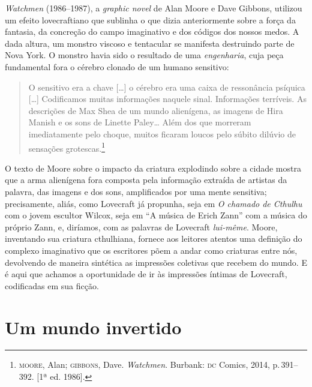 \emph{Watchmen} (1986--1987), a \emph{graphic novel} de Alan Moore e Dave
Gibbons, utilizou um efeito lovecraftiano que sublinha o que dizia
anteriormente sobre a força da fantasia, da concreção do campo
imaginativo e dos códigos dos nossos medos. A dada altura, um monstro
viscoso e tentacular se manifesta destruindo parte de Nova York. O
monstro havia sido o resultado de uma \emph{engenharia}, cuja peça
fundamental fora o cérebro clonado de um humano sensitivo: 

\begin{quote}
O sensitivo
era a chave [\ldots{}] o cérebro era uma caixa de ressonância psíquica [\ldots{}]
Codificamos muitas informações naquele sinal. Informações terríveis. As
descrições de Max Shea de um mundo alienígena, as imagens de Hira Manish
e os sons de Linette Paley\ldots{} Além dos que morreram imediatamente pelo
choque, muitos ficaram loucos pelo súbito dilúvio de sensações
grotescas.\footnote{\textsc{moore}, Alan; \textsc{gibbons}, Dave. \emph{Watchmen}.
  Burbank: \textsc{dc} Comics, 2014, p.\,391--392. [1ª ed. 1986].}
\end{quote}

O texto de Moore sobre o impacto da criatura explodindo sobre a cidade
mostra que a arma alienígena fora composta pela informação extraída de
artistas da palavra, das imagens e dos sons,
amplificados por uma mente sensitiva; precisamente, aliás, como
Lovecraft já propunha, seja em \emph{O chamado de Cthulhu} com o jovem
escultor Wilcox, seja em ``A música de Erich Zann'' com a música do
próprio Zann, e, diríamos, com as palavras de Lovecraft \emph{lui-même}.
Moore, inventando sua criatura cthulhiana, fornece aos leitores atentos
uma definição do complexo imaginativo que os escritores põem a andar
como criaturas entre nós, devolvendo de maneira sintética as impressões
coletivas que recebem do mundo. E é aqui que achamos a oportunidade de
ir às impressões íntimas de Lovecraft, codificadas em sua ficção.

\section{Um mundo invertido}

